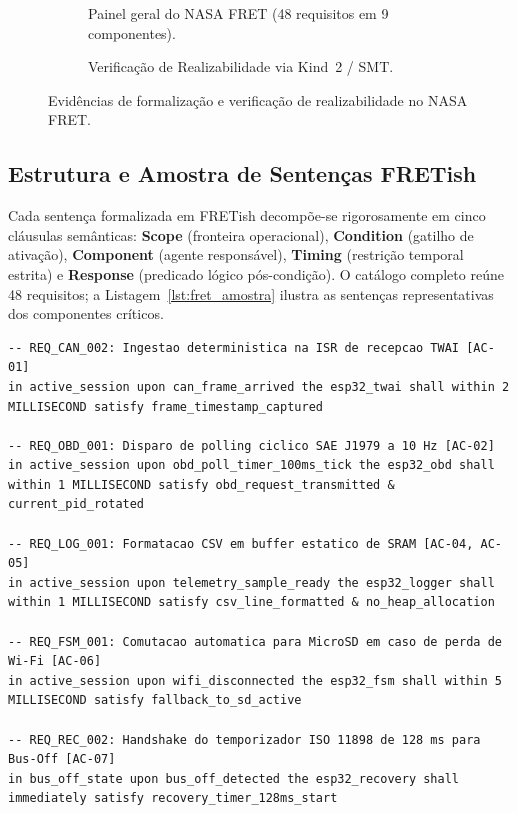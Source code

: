 \begin{figure}[htbp]
    \centering
    \begin{subfigure}[b]{0.48\textwidth}
        \centering
        \caption{Painel geral do NASA FRET (48 requisitos em 9 componentes).}
        \label{fig:fret_dashboard}
    \end{subfigure}
    \hfill
    \begin{subfigure}[b]{0.48\textwidth}
        \centering
        \caption{Verificação de Realizabilidade via Kind~2 / SMT.}
        \label{fig:fret_realizability}
    \end{subfigure}
    \caption{Evidências de formalização e verificação de realizabilidade no NASA FRET.}
    \label{fig:fret_evidencias}
\end{figure}

\subsection{Estrutura e Amostra de Sentenças FRETish}
Cada sentença formalizada em FRETish decompõe-se rigorosamente em cinco cláusulas semânticas: \textbf{Scope} (fronteira operacional), \textbf{Condition} (gatilho de ativação), \textbf{Component} (agente responsável), \textbf{Timing} (restrição temporal estrita) e \textbf{Response} (predicado lógico pós-condição). O catálogo completo reúne 48 requisitos; a Listagem~\ref{lst:fret_amostra} ilustra as sentenças representativas dos componentes críticos.

\begin{lstlisting}[language=FRETish, caption={Amostra de sentenças representativas codificadas em FRETish.}, label={lst:fret_amostra}]
-- REQ_CAN_002: Ingestao deterministica na ISR de recepcao TWAI [AC-01]
in active_session upon can_frame_arrived the esp32_twai shall within 2 MILLISECOND satisfy frame_timestamp_captured

-- REQ_OBD_001: Disparo de polling ciclico SAE J1979 a 10 Hz [AC-02]
in active_session upon obd_poll_timer_100ms_tick the esp32_obd shall within 1 MILLISECOND satisfy obd_request_transmitted & current_pid_rotated

-- REQ_LOG_001: Formatacao CSV em buffer estatico de SRAM [AC-04, AC-05]
in active_session upon telemetry_sample_ready the esp32_logger shall within 1 MILLISECOND satisfy csv_line_formatted & no_heap_allocation

-- REQ_FSM_001: Comutacao automatica para MicroSD em caso de perda de Wi-Fi [AC-06]
in active_session upon wifi_disconnected the esp32_fsm shall within 5 MILLISECOND satisfy fallback_to_sd_active

-- REQ_REC_002: Handshake do temporizador ISO 11898 de 128 ms para Bus-Off [AC-07]
in bus_off_state upon bus_off_detected the esp32_recovery shall immediately satisfy recovery_timer_128ms_start
\end{lstlisting}

